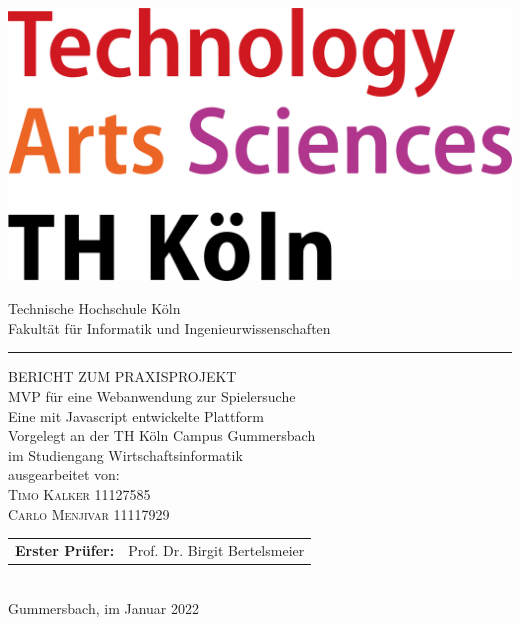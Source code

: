 \documentclass[a4paper,12pt,oneside]{article}
\begin{document}
\pagestyle{empty} %
\newpage %

\pagestyle{empty}
\begin{titlepage}
  \includegraphics[scale=0.20]{sources/TH_Koeln_Logo}\\
  \begin{center}
    \Large
    Technische Hochschule Köln\\
    Fakultät für Informatik und Ingenieurwissenschaften\\
    \hrule\par\rule{0pt}{2cm}
    \LARGE
    \textsc{BERICHT ZUM PRAXISPROJEKT}\\
    \vspace{0.8cm}
    \huge
    MVP für eine Webanwendung zur Spielersuche\\ 
    \Large
    Eine mit Javascript entwickelte Plattform \\
    \vspace{0.8cm}
    \large
    Vorgelegt an der TH Köln Campus Gummersbach\\
    im Studiengang Wirtschaftsinformatik\\
    \vspace{0.8cm}
    ausgearbeitet von:\\
    \textsc{Timo Kalker} 11127585\\
    \textsc{Carlo Menjivar} 11117929\\
    \vspace{1cm}
    \begin{tabular}{ll} %
      \textbf{Erster Prüfer:}  & Prof. Dr. Birgit Bertelsmeier \\
    \end{tabular}
    \vspace{0.5cm}
    \\Gummersbach, im Januar 2022
  \end{center}
\end{titlepage}
\end{document}
